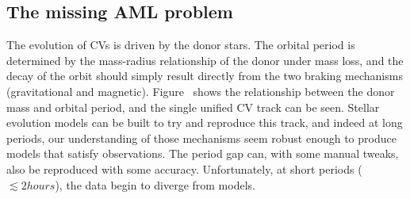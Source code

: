 
\subsection{The missing AML problem}

The evolution of CVs is driven by the donor stars. The orbital period is determined by the mass-radius relationship of the donor under mass loss, and the decay of the orbit should simply result directly from the two braking mechanisms (gravitational and magnetic). Figure~ shows the relationship between the donor mass and orbital period, and the single unified CV track can be seen. Stellar evolution models can be built to try and reproduce this track, and indeed at long periods, our understanding of those mechanisms seem robust enough to produce models that satisfy observations. The period gap can, with some manual tweaks, also be reproduced with some accuracy. Unfortunately, at short periods ($\lesssim 2 hours$), the data begin to diverge from models. 

